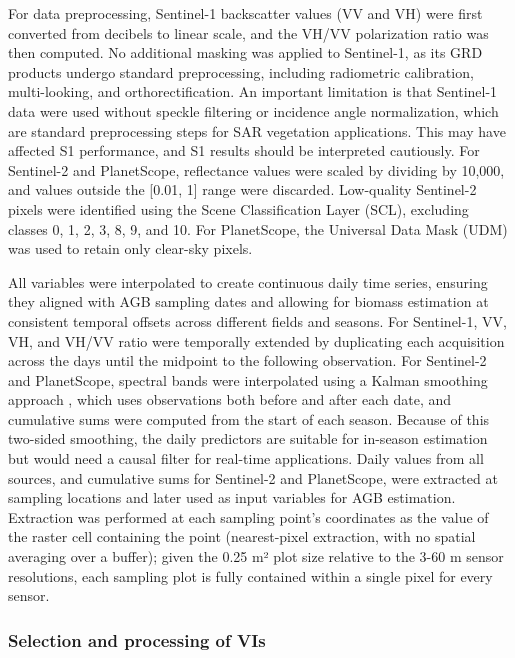 \documentclass[
  english,
  review,
  number,
  sort,compress,
  authoryear,
  3p]{elsarticle}
\begin{document}
For data preprocessing, Sentinel-1 backscatter values (VV and VH) were
first converted from decibels to linear scale, and the VH/VV
polarization ratio was then computed. No additional masking was applied
to Sentinel-1, as its GRD products undergo standard preprocessing,
including radiometric calibration, multi-looking, and
orthorectification. An important limitation is that Sentinel-1 data were
used without speckle filtering or incidence angle normalization, which
are standard preprocessing steps for SAR vegetation applications. This
may have affected S1 performance, and S1 results should be interpreted
cautiously. For Sentinel-2 and PlanetScope, reflectance values were
scaled by dividing by 10,000, and values outside the {[}0.01, 1{]} range
were discarded. Low-quality Sentinel-2 pixels were identified using the
Scene Classification Layer (SCL), excluding classes 0, 1, 2, 3, 8, 9,
and 10. For PlanetScope, the Universal Data Mask (UDM) was used to
retain only clear-sky pixels.

All variables were interpolated to create continuous daily time series,
ensuring they aligned with AGB sampling dates and allowing for biomass
estimation at consistent temporal offsets across different fields and
seasons. For Sentinel-1, VV, VH, and VH/VV ratio were temporally
extended by duplicating each acquisition across the days until the
midpoint to the following observation. For Sentinel-2 and PlanetScope,
spectral bands were interpolated using a Kalman smoothing approach
\citep{Moritz2017}, which uses observations both before and after each
date, and cumulative sums were computed from the start of each season.
Because of this two-sided smoothing, the daily predictors are suitable
for in-season estimation but would need a causal filter for real-time
applications. Daily values from all sources, and cumulative sums for
Sentinel-2 and PlanetScope, were extracted at sampling locations and
later used as input variables for AGB estimation. Extraction was
performed at each sampling point's coordinates as the value of the
raster cell containing the point (nearest-pixel extraction, with no
spatial averaging over a buffer); given the 0.25 m² plot size relative
to the 3-60 m sensor resolutions, each sampling plot is fully contained
within a single pixel for every sensor.

\subsubsection{Selection and processing of
VIs}\label{selection-and-processing-of-vis}
\end{document}
